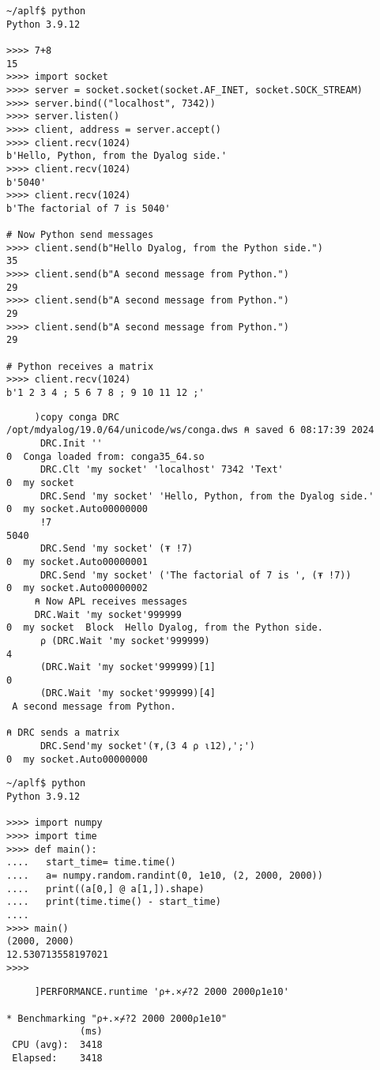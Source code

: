 
\begin{verbatim}
~/aplf$ python
Python 3.9.12

>>>> 7+8
15
>>>> import socket
>>>> server = socket.socket(socket.AF_INET, socket.SOCK_STREAM)
>>>> server.bind(("localhost", 7342)) 
>>>> server.listen()
>>>> client, address = server.accept()
>>>> client.recv(1024)
b'Hello, Python, from the Dyalog side.'
>>>> client.recv(1024)
b'5040'
>>>> client.recv(1024)
b'The factorial of 7 is 5040'

# Now Python send messages
>>>> client.send(b"Hello Dyalog, from the Python side.")
35
>>>> client.send(b"A second message from Python.")
29
>>>> client.send(b"A second message from Python.")
29
>>>> client.send(b"A second message from Python.")
29

# Python receives a matrix
>>>> client.recv(1024)
b'1 2 3 4 ; 5 6 7 8 ; 9 10 11 12 ;'
\end{verbatim}

\newpage

\begin{verbatim}
     )copy conga DRC
/opt/mdyalog/19.0/64/unicode/ws/conga.dws ⍝ saved 6 08:17:39 2024
      DRC.Init ''
0  Conga loaded from: conga35_64.so
      DRC.Clt 'my socket' 'localhost' 7342 'Text'
0  my socket
      DRC.Send 'my socket' 'Hello, Python, from the Dyalog side.'
0  my socket.Auto00000000
      !7
5040
      DRC.Send 'my socket' (⍕ !7)
0  my socket.Auto00000001
      DRC.Send 'my socket' ('The factorial of 7 is ', (⍕ !7))
0  my socket.Auto00000002
     ⍝ Now APL receives messages
     DRC.Wait 'my socket'999999
0  my socket  Block  Hello Dyalog, from the Python side.
      ⍴ (DRC.Wait 'my socket'999999)
4
      (DRC.Wait 'my socket'999999)[1]
0
      (DRC.Wait 'my socket'999999)[4]
 A second message from Python.

⍝ DRC sends a matrix
      DRC.Send'my socket'(⍕,(3 4 ⍴ ⍳12),';')
0  my socket.Auto00000000
\end{verbatim}

\newpage
\begin{verbatim}
~/aplf$ python
Python 3.9.12

>>>> import numpy
>>>> import time
>>>> def main():
....   start_time= time.time()
....   a= numpy.random.randint(0, 1e10, (2, 2000, 2000))
....   print((a[0,] @ a[1,]).shape)
....   print(time.time() - start_time)
....   
>>>> main()
(2000, 2000)
12.530713558197021
>>>> 
\end{verbatim}

\begin{verbatim}
     ]PERFORMANCE.runtime '⍴+.×⌿?2 2000 2000⍴1e10'

* Benchmarking "⍴+.×⌿?2 2000 2000⍴1e10"
             (ms)
 CPU (avg):  3418
 Elapsed:    3418
\end{verbatim}

